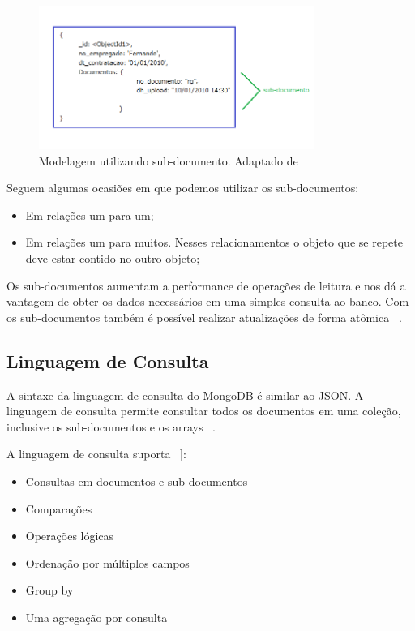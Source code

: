 	\begin{figure}[!htbp]
		\begin{center}
			\includegraphics[width=0.8\textwidth]{subdocumento}
		\end{center}
		\caption{ Modelagem utilizando sub-documento. Adaptado de ~\cite{sitemongodb}}
		\label{fig:subdocumento}
	\end{figure}

Seguem algumas ocasiões em que podemos utilizar os sub-documentos:

\begin{itemize}
	\item Em relações um para um;
	\item Em relações um para muitos. Nesses relacionamentos o objeto que se repete deve estar contido no outro objeto;
\end{itemize}

Os sub-documentos aumentam a performance de operações de leitura e nos dá a vantagem de obter os dados necessários em uma simples consulta ao banco. Com os sub-documentos também é possível realizar atualizações de forma atômica ~\cite{Orendanalysisand}.

\subsection{Linguagem de Consulta}

A sintaxe da linguagem de consulta do MongoDB é similar ao JSON. A linguagem de consulta permite consultar todos os documentos em uma coleção, inclusive os sub-documentos e os arrays ~\cite{Orendanalysisand}.

A linguagem de consulta suporta ~\cite{Orendanalysisand}]:
\begin{itemize}
	\item Consultas em documentos e sub-documentos
	\item Comparações
	\item Operações lógicas
	\item Ordenação por múltiplos campos
	\item Group by
	\item Uma agregação por consulta
\end{itemize}

